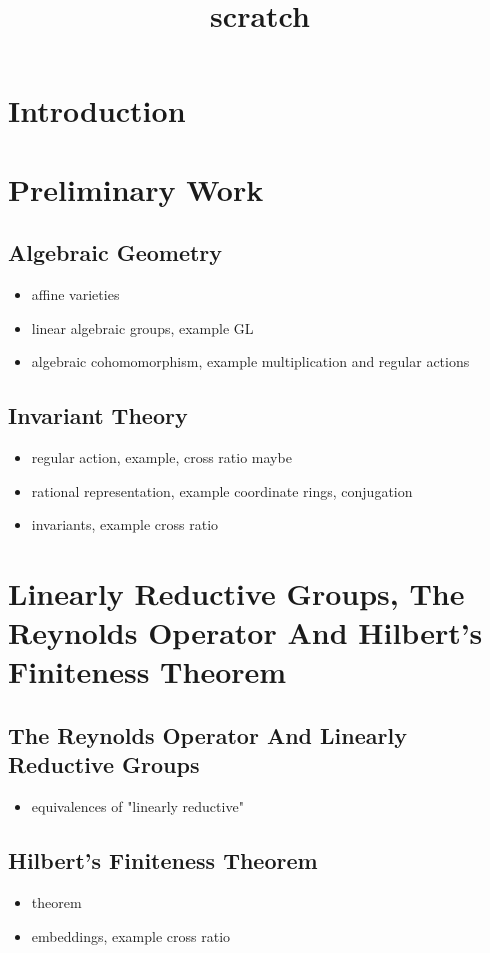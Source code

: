 \documentclass[11pt]{article}
\date{}
\title{scratch}
\begin{document}
\maketitle
\section*{Introduction}
\label{sec-1}
\section*{Preliminary Work}
\label{sec-2}
\subsection*{Algebraic Geometry}
\label{sec-2-1}
\begin{itemize}
\item affine varieties
\item linear algebraic groups, example GL
\item algebraic cohomomorphism, example multiplication and regular actions
\end{itemize}
\subsection*{Invariant Theory}
\label{sec-2-2}
\begin{itemize}
\item regular action, example, cross ratio maybe
\item rational representation, example coordinate rings, conjugation
\item invariants, example cross ratio
\end{itemize}
\section*{Linearly Reductive Groups, The Reynolds Operator And Hilbert's Finiteness Theorem}
\label{sec-3}
\subsection*{The Reynolds Operator And Linearly Reductive Groups}
\label{sec-3-1}
\begin{itemize}
\item equivalences of "linearly reductive"
\end{itemize}
\subsection*{Hilbert's Finiteness Theorem}
\label{sec-3-2}
\begin{itemize}
\item theorem
\item embeddings, example cross ratio
\end{itemize}
\end{document}
